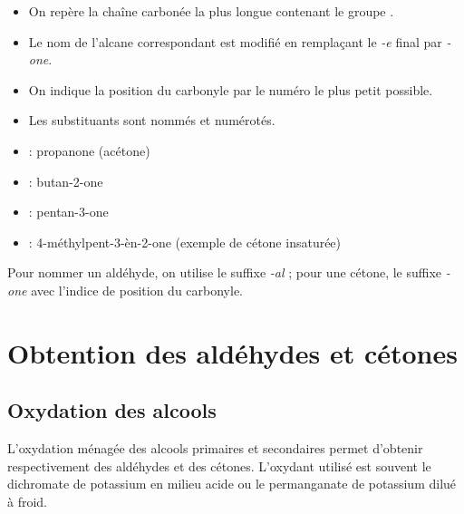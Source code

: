 \begin{loi}
\begin{itemize}
    \item On repère la chaîne carbonée la plus longue contenant le groupe .
    \item Le nom de l'alcane correspondant est modifié en remplaçant le \textit{-e} final par \textit{-one}.
    \item On indique la position du carbonyle par le numéro le plus petit possible.
    \item Les substituants sont nommés et numérotés.
\end{itemize}
\end{loi}

\begin{exemple}
\begin{itemize}
    \item {} : propanone (acétone)
    \item {} : butan-2-one
    \item {} : pentan-3-one
    \item {} : 4-méthylpent-3-èn-2-one (exemple de cétone insaturée)
\end{itemize}
\end{exemple}

\begin{aretenir}
Pour nommer un aldéhyde, on utilise le suffixe \textit{-al} ; pour une cétone, le suffixe \textit{-one} avec l'indice de position du carbonyle.
\end{aretenir}

\section{Obtention des aldéhydes et cétones}

\subsection{Oxydation des alcools}

\begin{experience}
L'oxydation ménagée des alcools primaires et secondaires permet d'obtenir respectivement des aldéhydes et des cétones. L'oxydant utilisé est souvent le dichromate de potassium  en milieu acide ou le permanganate de potassium  dilué à froid.
\end{experience}

